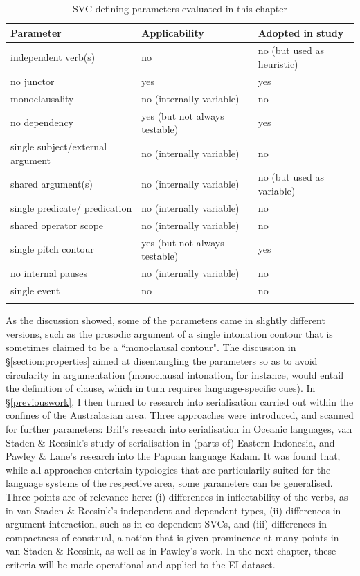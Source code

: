 \begin{table}
    \centering
    \begin{footnotesize}
    \begin{tabular}{l l l}
    \lsptoprule
Parameter & Applicability & Adopted in study \\
\midrule
independent verb(s) & no & no (but used as heuristic) \\
no junctor & yes & yes \\
monoclausality & no (internally variable) & no \\
no dependency & yes (but not always testable) & yes \\
single subject/external argument & no (internally variable) & no \\
shared argument(s) & no (internally variable) & no (but used as variable) \\
single predicate/ predication & no (internally variable) & no \\
shared operator scope & no (internally variable) & no \\
single pitch contour & yes (but not always testable) & yes \\
no internal pauses & no (internally variable) & no \\
single event & no & no \\
\lspbottomrule
    \end{tabular}
    \end{footnotesize}
    \caption{SVC-defining parameters evaluated in this chapter}
    \label{tab:parameters_used}
\end{table}

As the discussion showed, some of the parameters came in slightly different versions, such as the prosodic argument of a single intonation contour that is sometimes claimed to be a ``monoclausal contour". The discussion in §\ref{section:properties} aimed at disentangling the parameters so as to avoid circularity in argumentation (monoclausal intonation, for instance, would entail the definition of clause, which in turn requires language-specific cues). In §\ref{previouswork}, I then turned to research into serialisation carried out within the confines of the Australasian area. Three approaches were introduced, and scanned for further parameters: Bril's research into serialisation in Oceanic languages, van Staden \& Reesink's study of serialisation in (parts of) Eastern Indonesia, and Pawley \& Lane's research into the Papuan language Kalam. It was found that, while all approaches entertain typologies that are particularily suited for the language systems of the respective area, some parameters can be generalised. Three points are of relevance here: (i) differences in inflectability of the verbs, as in van Staden \& Reesink's independent and dependent types, (ii) differences in argument interaction, such as in co-dependent SVCs, and (iii) differences in compactness of construal, a notion that is given prominence at many points in van Staden \& Reesink, as well as in Pawley's work. In the next chapter, these criteria will be made operational and applied to the EI dataset.

